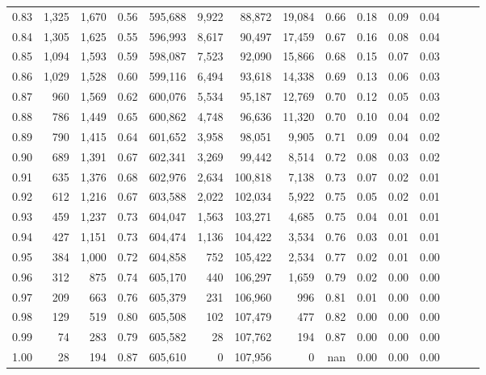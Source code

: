 \begin{tabular}{rrrrrrrrrrrrrrr}
0.83 &   1,325 &  1,670 &  0.56 &  595,688 &    9,922 &   88,872 &   19,084 &  0.66 &  0.18 &  0.09 &      0.04 \\
0.84 &   1,305 &  1,625 &  0.55 &  596,993 &    8,617 &   90,497 &   17,459 &  0.67 &  0.16 &  0.08 &      0.04 \\
0.85 &   1,094 &  1,593 &  0.59 &  598,087 &    7,523 &   92,090 &   15,866 &  0.68 &  0.15 &  0.07 &      0.03 \\
0.86 &   1,029 &  1,528 &  0.60 &  599,116 &    6,494 &   93,618 &   14,338 &  0.69 &  0.13 &  0.06 &      0.03 \\
0.87 &     960 &  1,569 &  0.62 &  600,076 &    5,534 &   95,187 &   12,769 &  0.70 &  0.12 &  0.05 &      0.03 \\
0.88 &     786 &  1,449 &  0.65 &  600,862 &    4,748 &   96,636 &   11,320 &  0.70 &  0.10 &  0.04 &      0.02 \\
0.89 &     790 &  1,415 &  0.64 &  601,652 &    3,958 &   98,051 &    9,905 &  0.71 &  0.09 &  0.04 &      0.02 \\
0.90 &     689 &  1,391 &  0.67 &  602,341 &    3,269 &   99,442 &    8,514 &  0.72 &  0.08 &  0.03 &      0.02 \\
0.91 &     635 &  1,376 &  0.68 &  602,976 &    2,634 &  100,818 &    7,138 &  0.73 &  0.07 &  0.02 &      0.01 \\
0.92 &     612 &  1,216 &  0.67 &  603,588 &    2,022 &  102,034 &    5,922 &  0.75 &  0.05 &  0.02 &      0.01 \\
0.93 &     459 &  1,237 &  0.73 &  604,047 &    1,563 &  103,271 &    4,685 &  0.75 &  0.04 &  0.01 &      0.01 \\
0.94 &     427 &  1,151 &  0.73 &  604,474 &    1,136 &  104,422 &    3,534 &  0.76 &  0.03 &  0.01 &      0.01 \\
0.95 &     384 &  1,000 &  0.72 &  604,858 &      752 &  105,422 &    2,534 &  0.77 &  0.02 &  0.01 &      0.00 \\
0.96 &     312 &    875 &  0.74 &  605,170 &      440 &  106,297 &    1,659 &  0.79 &  0.02 &  0.00 &      0.00 \\
0.97 &     209 &    663 &  0.76 &  605,379 &      231 &  106,960 &      996 &  0.81 &  0.01 &  0.00 &      0.00 \\
0.98 &     129 &    519 &  0.80 &  605,508 &      102 &  107,479 &      477 &  0.82 &  0.00 &  0.00 &      0.00 \\
0.99 &      74 &    283 &  0.79 &  605,582 &       28 &  107,762 &      194 &  0.87 &  0.00 &  0.00 &      0.00 \\
1.00 &      28 &    194 &  0.87 &  605,610 &        0 &  107,956 &        0 &   nan &  0.00 &  0.00 &      0.00 \\
\bottomrule
\end{tabular}
